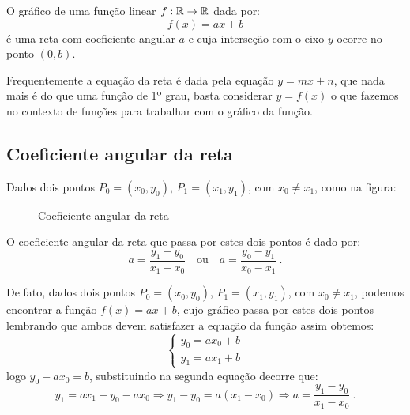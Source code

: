 \begin{obs}
 O gráfico de uma função linear $f: \mathbb{R} \to \mathbb{R}$ dada por:
\begin{equation*}
f(x) = ax + b
\end{equation*}
 é uma reta com coeficiente angular $a$ e cuja interseção com o eixo $y$ ocorre no ponto $(0, b)$.
\end{obs}

 Frequentemente a equação da reta é dada pela equação $y=mx+n$, que nada mais é do que uma função de 1º grau, basta considerar $y=f(x)$ o que fazemos no contexto de funções para trabalhar com o gráfico da função.

 \subsection{Coeficiente angular da reta}

  Dados dois pontos $P_0=(x_0, y_0)$, $P_1=(x_1, y_1)$, com $x_0 \neq x_1$, como na figura:

 \begin{figure}[H]
 \centering
    \caption{Coeficiente angular da reta}
  \end{figure}

  O coeficiente angular da reta que passa por estes dois pontos é dado por:
\begin{equation*}
a= \frac{y_1 - y_0}{x_1 - x_0} \ \ \ \text{ ou } \ \ \ a= \frac{y_0 - y_1}{x_0 - x_1} \ .
\end{equation*}

  De fato, dados dois pontos $P_0=(x_0, y_0)$, $P_1=(x_1, y_1)$, com $x_0 \neq x_1$, podemos encontrar a função $f(x)= ax+b$, cujo gráfico passa por estes dois pontos lembrando que ambos devem satisfazer a equação da função assim obtemos:
  \[ \begin{cases}
   y_0= ax_0 + b \\
   y_1= ax_1 + b
  \end{cases} \]
  logo $y_0 - ax_0= b$, substituindo na segunda equação decorre que:
\begin{equation*}
y_1= ax_1 + y_0 - ax_0 \Rightarrow y_1 - y_0= a(x_1 - x_0) \Rightarrow a= \frac{y_1 - y_0}{x_1 - x_0} \ . 
\end{equation*}

